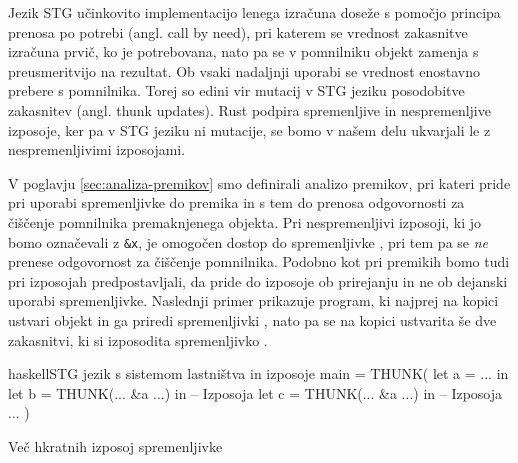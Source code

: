 Jezik STG učinkovito implementacijo lenega izračuna doseže s pomočjo principa prenosa po potrebi (angl. call by need), pri katerem se vrednost zakasnitve izračuna prvič, ko je potrebovana, nato pa se v pomnilniku objekt zamenja s preusmeritvijo na rezultat. Ob vsaki nadaljnji uporabi se vrednost enostavno prebere s pomnilnika. Torej so edini vir mutacij v STG jeziku posodobitve zakasnitev (angl. thunk updates). Rust podpira spremenljive in nespremenljive izposoje, ker pa v STG jeziku ni mutacije, se bomo v našem delu ukvarjali le z nespremenljivimi izposojami.



V poglavju \ref{sec:analiza-premikov} smo definirali analizo premikov, pri kateri pride pri uporabi spremenljivke do premika in s tem do prenosa odgovornosti za čiščenje pomnilnika premaknjenega objekta. Pri nespremenljivi izposoji, ki jo bomo označevali z \texttt{\&x}, je omogočen dostop do spremenljivke , pri tem pa se \emph{ne} prenese odgovornost za čiščenje pomnilnika. Podobno kot pri premikih bomo tudi pri izposojah predpostavljali, da pride do izposoje ob prirejanju in ne ob dejanski uporabi spremenljivke. Naslednji primer prikazuje program, ki najprej na kopici ustvari objekt in ga priredi spremenljivki , nato pa se na kopici ustvarita še dve zakasnitvi, ki si izposodita spremenljivko .

\begin{primer}[ht]
\centering
\begin{code-box}{haskell}{STG jezik s sistemom lastništva in izposoje}
main = THUNK(
    let a = ... in
    let b = THUNK(... &a ...) in -- Izposoja
    let c = THUNK(... &a ...) in -- Izposoja
        ...
)
\end{code-box}
\caption{Več hkratnih izposoj spremenljivke}
\label{pr:}
\end{primer}


